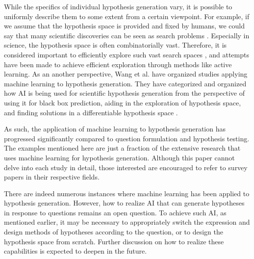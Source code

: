 While the specifics of individual hypothesis generation vary, it is possible to uniformly describe them to some extent from a certain viewpoint. For example, if we assume that the hypothesis space is provided and fixed by humans, we could say that many scientific discoveries can be seen as search problems \cite{coley2020autonomous}. Especially in science, the hypothesis space is often combinatorially vast. Therefore, it is considered important to efficiently explore such vast search spaces \cite{coley2020autonomousII,zenil2023future}, and attempts have been made to achieve efficient exploration through methods like active learning. As an another perspective, Wang et al. have organized studies applying machine learning to hypothesis generation. They have categorized and organized how AI is being used for scientific hypothesis generation from the perspective of using it for black box prediction, aiding in the exploration of hypothesis space, and finding solutions in a differentiable hypothesis space \cite{wang2023scientific}.

As such, the application of machine learning to hypothesis generation has progressed significantly compared to question formulation and hypothesis testing. The examples mentioned here are just a fraction of the extensive research that uses machine learning for hypothesis generation. Although this paper cannot delve into each study in detail, those interested are encouraged to refer to survey papers in their respective fields.

There are indeed numerous instances where machine learning has been applied to hypothesis generation. However, how to realize AI that can generate hypotheses in response to questions remains an open question. To achieve such AI, as mentioned earlier, it may be necessary to appropriately switch the expression and design methods of hypotheses according to the question, or to design the hypothesis space from scratch. Further discussion on how to realize these capabilities is expected to deepen in the future.



